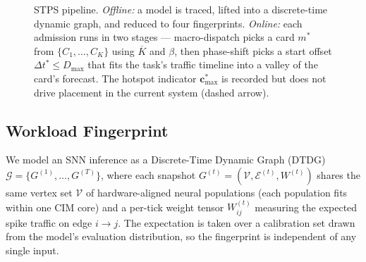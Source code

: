 \documentclass[letterpaper,twocolumn,10pt]{article}
\begin{document}
\begin{figure}[t]
{%
    }
    \caption{STPS pipeline. \emph{Offline:} a model is traced, lifted into a discrete-time dynamic graph, and reduced to four fingerprints. \emph{Online:} each admission runs in two stages --- macro-dispatch picks a card $m^{*}$ from $\{C_1,\dots,C_K\}$ using $\overline{K}$ and $\beta$, then phase-shift picks a start offset $\Delta t^{*}\!\le\!D_{\max}$ that fits the task's traffic timeline into a valley of the card's forecast. The hotspot indicator $\mathbf{c}^{*}_{\max}$ is recorded but does not drive placement in the current system (dashed arrow).}
    \label{fig:arch}
\end{figure}

\subsection{Workload Fingerprint}
\label{sec:design:fingerprint}

We model an SNN inference as a Discrete-Time Dynamic Graph (DTDG) $\mathcal{G} = \{G^{(1)}, \dots, G^{(T)}\}$, where each snapshot $G^{(t)} = (\mathcal{V}, \mathcal{E}^{(t)}, W^{(t)})$ shares the same vertex set $\mathcal{V}$ of hardware-aligned neural populations (each population fits within one CIM core) and a per-tick weight tensor $W^{(t)}_{ij}$ measuring the expected spike traffic on edge $i\!\to\!j$. The expectation is taken over a calibration set drawn from the model's evaluation distribution, so the fingerprint is independent of any single input.
\end{document}
